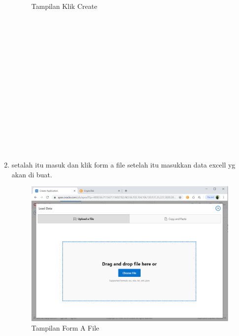\documentclass{article}
\begin{document}
\begin{enumerate}
\begin{figure}[h]
		\caption{Tampilan Klik Create}
\end{figure}
\\
\\
\\
\\
\\
\\
\\
\\
\\
\\
\\
\\
\\
\\
	\item setalah itu masuk dan klik form a file setelah itu masukkan data excell yg akan di buat.
	\begin{figure}[h]
	\centering
		\includegraphics[scale=0.5]{gambar/5.PNG}
		\caption{Tampilan Form A File}
\end{figure}
\\
\\
\\
\\
\\
\\
\\
\\
\\
\\
\\
\\
\\
\\
\\
\\
\\
\\
\\
\\
\\
\\
\\


\end{enumerate}
\end{document}
